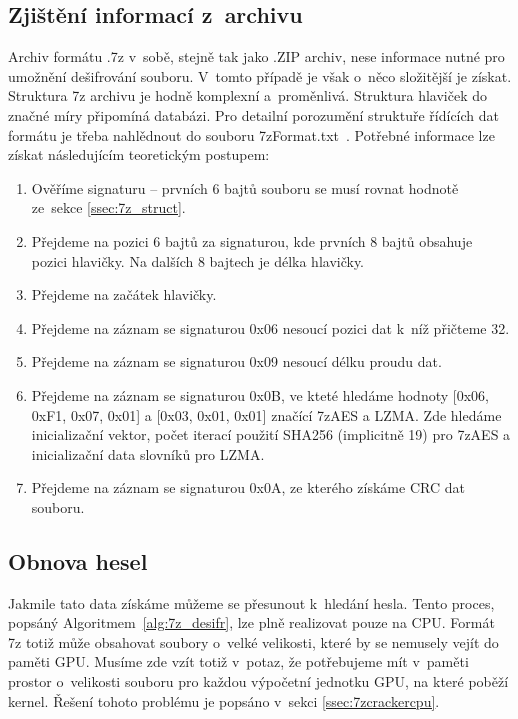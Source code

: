 \subsection{Zjištění informací z~archivu}
Archiv formátu .7z v~sobě, stejně tak jako .ZIP archiv, nese informace nutné pro umožnění
dešifrování souboru. V~tomto případě je však o~něco složitější je získat. Struktura 7z archivu
je hodně komplexní a~proměnlivá. Struktura hlaviček do značné míry připomíná databázi. Pro
detailní porozumění struktuře řídících dat formátu je třeba nahlědnout do souboru
7zFormat.txt~\cite{Pavlov:2010}. Potřebné informace lze získat následujícím 
teoretickým postupem:
\begin{enumerate}
    \item Ověříme signaturu -- prvních 6 bajtů souboru se musí rovnat hodnotě ze~sekce \ref{ssec:7z_struct}. 
    \item Přejdeme na pozici 6 bajtů za signaturou, kde	prvních 8 bajtů obsahuje pozici hlavičky.
	Na dalších 8 bajtech je délka hlavičky.
    \item Přejdeme na začátek hlavičky.
    \item Přejdeme na záznam se signaturou 0x06 nesoucí pozici dat k~níž přičteme 32.
    \item Přejdeme na záznam se signaturou 0x09 nesoucí délku proudu dat.
    \item Přejdeme na záznam se signaturou 0x0B, ve kteté hledáme hodnoty [0x06, 0xF1, 0x07, 0x01]
	a [0x03, 0x01, 0x01] značící 7zAES a LZMA. Zde hledáme inicializační vektor, počet iterací použití SHA256 (implicitně
	19) pro 7zAES a inicializační data slovníků pro LZMA.
    \item Přejdeme na záznam se signaturou 0x0A, ze kterého získáme CRC dat souboru.
\end{enumerate}

\subsection{Obnova hesel}
Jakmile tato data získáme můžeme se přesunout k~hledání hesla. Tento proces, popsáný
Algoritmem~\ref{alg:7z_desifr}, lze plně realizovat pouze na CPU. Formát 7z totiž může obsahovat
soubory o~velké velikosti, které by se nemusely vejít do paměti GPU. Musíme zde vzít totiž
v~potaz, že potřebujeme mít v~paměti prostor o~velikosti souboru pro každou výpočetní jednotku GPU,
na které poběží kernel. Řešení tohoto problému je popsáno v~sekci \ref{ssec:7zcrackercpu}.

